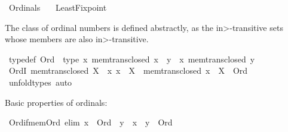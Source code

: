 %
\begin{isabellebody}%
%
%
\isadelimdocument
%
\endisadelimdocument
%
\isatagdocument
\isanewline
\isanewline
%
\isamarkuptrue%
%
\endisatagdocument
{\isafolddocument}%
%
\isadelimdocument
%
\endisadelimdocument
%
\isadelimtheory
%
\endisadelimtheory
%
\isatagtheory
{}\isamarkupfalse%
\ Ordinals\isanewline
\ \ \ Least{\isacharunderscore}{\kern0pt}Fixpoint\isanewline
{}%
\endisatagtheory
{\isafoldtheory}%
%
\isadelimtheory
%
\endisadelimtheory
%
\begin{isamarkuptext}%
The class of ordinal numbers is defined abstractly, as the \<in>-transitive sets
whose members are also \<in>-transitive.%
\end{isamarkuptext}\isamarkuptrue%
\isamarkupfalse%
\ {\isacharbrackleft}{\kern0pt}typedef{\isacharbrackright}{\kern0pt}{\isacharcolon}{\kern0pt}\ {\isachardoublequoteopen}Ord\ {\isasymequiv}\ type\ {\isacharparenleft}{\kern0pt}{\isasymlambda}x{\isachardot}{\kern0pt}\ mem{\isacharunderscore}{\kern0pt}trans{\isacharunderscore}{\kern0pt}closed\ x\ {\isasymand}\ {\isacharparenleft}{\kern0pt}{\isasymforall}y\ {\isasymin}\ x{\isachardot}{\kern0pt}\ mem{\isacharunderscore}{\kern0pt}trans{\isacharunderscore}{\kern0pt}closed\ y{\isacharparenright}{\kern0pt}{\isacharparenright}{\kern0pt}{\isachardoublequoteclose}\isanewline
\isanewline
{}\isamarkupfalse%
\ OrdI{\isacharcolon}{\kern0pt}\ {\isachardoublequoteopen}mem{\isacharunderscore}{\kern0pt}trans{\isacharunderscore}{\kern0pt}closed\ X\ {\isasymLongrightarrow}\ {\isacharparenleft}{\kern0pt}{\isasymAnd}x{\isachardot}{\kern0pt}\ x\ {\isasymin}\ X\ {\isasymLongrightarrow}\ mem{\isacharunderscore}{\kern0pt}trans{\isacharunderscore}{\kern0pt}closed\ x{\isacharparenright}{\kern0pt}\ {\isasymLongrightarrow}\ X\ {\isacharcolon}{\kern0pt}\ Ord{\isachardoublequoteclose}\isanewline
%
\isadelimproof
\ \ %
\endisadelimproof
%
\isatagproof
{}\isamarkupfalse%
\ unfold{\isacharunderscore}{\kern0pt}types\ auto%
\endisatagproof
{\isafoldproof}%
%
\isadelimproof
%
\endisadelimproof
%
\begin{isamarkuptext}%
Basic properties of ordinals:%
\end{isamarkuptext}\isamarkuptrue%
\isamarkupfalse%
\ Ord{\isacharunderscore}{\kern0pt}if{\isacharunderscore}{\kern0pt}mem{\isacharunderscore}{\kern0pt}Ord\ {\isacharbrackleft}{\kern0pt}elim{\isacharbrackright}{\kern0pt}{\isacharcolon}{\kern0pt}\ {\isachardoublequoteopen}x\ {\isacharcolon}{\kern0pt}\ Ord\ {\isasymLongrightarrow}\ y\ {\isasymin}\ x\ {\isasymLongrightarrow}\ y\ {\isacharcolon}{\kern0pt}\ Ord{\isachardoublequoteclose}\isanewline

\end{isabellebody}
